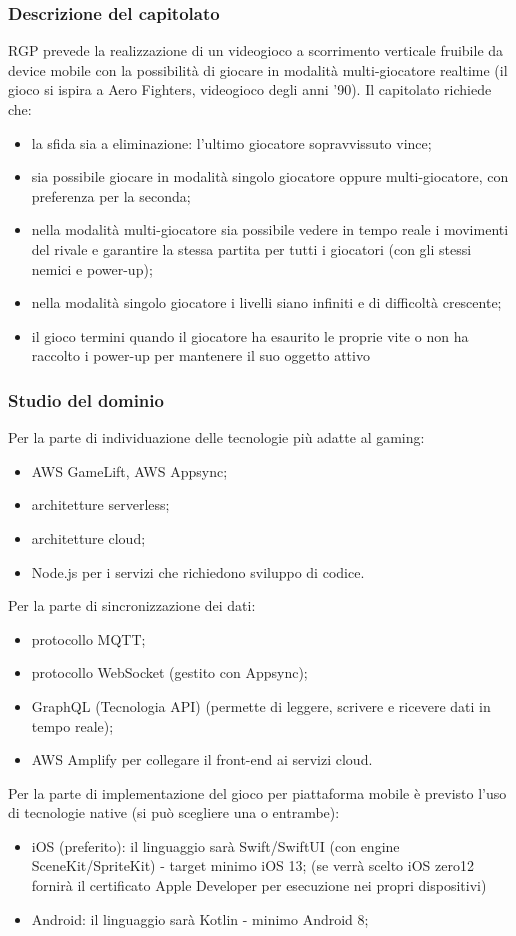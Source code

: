 \subsubsection{Descrizione del capitolato}
RGP prevede la realizzazione di un videogioco a scorrimento verticale fruibile da device mobile con la possibilità di giocare in modalità multi-giocatore realtime (il gioco si ispira a Aero Fighters, videogioco degli anni '90). Il capitolato richiede che:
\begin{itemize}
	\item la sfida sia a eliminazione: l'ultimo giocatore sopravvissuto vince;
	\item sia possibile giocare in modalità singolo giocatore oppure multi-giocatore, con preferenza per la seconda; 
	\item nella modalità multi-giocatore sia possibile vedere in tempo reale i movimenti del rivale e garantire la stessa partita per tutti i giocatori (con gli stessi nemici e power-up);
	\item nella modalità singolo giocatore i livelli siano infiniti e di difficoltà crescente;
	\item il gioco termini quando il giocatore ha esaurito le proprie vite o non ha raccolto i power-up per mantenere il suo oggetto attivo 
\end{itemize}
\subsubsection{Studio del dominio}
Per la parte di individuazione delle tecnologie più adatte al gaming:
\begin{itemize}
	\item AWS GameLift, AWS Appsync;
	\item architetture serverless;
	\item architetture cloud;
	\item Node.js per i servizi che richiedono sviluppo di codice.
\end{itemize}
Per la parte di sincronizzazione dei dati:
\begin{itemize}
	\item protocollo MQTT;
	\item protocollo WebSocket (gestito con Appsync);
	\item GraphQL (Tecnologia API) (permette di leggere, scrivere e ricevere dati in tempo reale);
	\item AWS Amplify per collegare il front-end ai servizi cloud.
\end{itemize}
Per la parte di implementazione del gioco per piattaforma mobile è previsto l'uso di tecnologie native (si può scegliere una o entrambe):
\begin{itemize}
	\item iOS (preferito): il linguaggio sarà Swift/SwiftUI (con engine SceneKit/SpriteKit) - target minimo iOS 13; (se verrà scelto iOS zero12 fornirà il certificato Apple Developer per esecuzione nei propri dispositivi)
	\item Android: il linguaggio sarà Kotlin - minimo Android 8;
\end{itemize}
